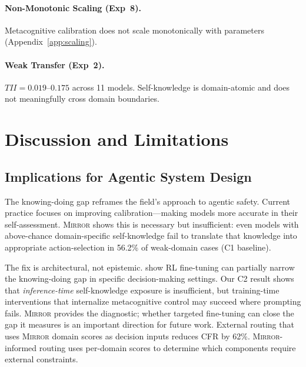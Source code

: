 \documentclass[10pt]{article}
\newcommand{\mirror}{\textsc{Mirror}}
\newcommand{\CFR}{CFR}
\newcommand{\TII}{TII}
\begin{document}
\paragraph{Non-Monotonic Scaling (Exp~8).}
Metacognitive calibration does not scale monotonically with parameters (Appendix~\ref{app:scaling}).

\paragraph{Weak Transfer (Exp~2).}
$\TII{} = 0.019$--$0.175$ across 11 models. Self-knowledge is domain-atomic and does not meaningfully cross domain boundaries.

\section{Discussion and Limitations}
\label{sec:discussion}

\subsection{Implications for Agentic System Design}

The knowing-doing gap reframes the field's approach to agentic safety. Current
practice focuses on improving calibration---making models more accurate in their
self-assessment. \mirror{} shows this is necessary but insufficient: even models
with above-chance domain-specific self-knowledge fail to translate that knowledge into
appropriate action-selection in 56.2\% of weak-domain cases (C1 baseline).

The fix is architectural, not epistemic.
\citet{schmied2026greedy} show RL fine-tuning can partially narrow the
knowing-doing gap in specific decision-making settings. Our C2 result shows that
\emph{inference-time} self-knowledge exposure is insufficient, but training-time
interventions that internalize metacognitive control may succeed where prompting
fails. \mirror{} provides the diagnostic; whether targeted fine-tuning can close
the gap it measures is an important direction for future work.
External routing that uses \mirror{}
domain scores as decision inputs reduces \CFR{} by 62\%. \mirror{}-informed routing uses per-domain scores to determine which components require external constraints.
\end{document}
